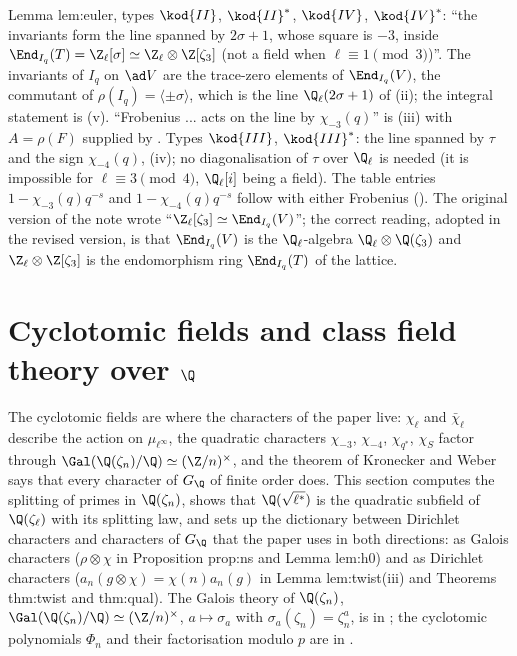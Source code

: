 \begin{paperlink}\label{pl:ant:euler}
Lemma lem:euler, types $\kod{II}$, $\kod{II}^*$, $\kod{IV}$, $\kod{IV}^*$: ``the invariants form the line spanned by $2\sigma+1$, whose square is $-3$, inside
$\End_{I_q}(T)=\Z_\ell[\sigma]\simeq\Z_\ell\otimes\Z[\zeta_3]$ (not a field when $\ell\equiv1\pmod3$)''. The invariants of $I_q$ on $\ad V$ are the trace-zero
elements of $\End_{I_q}(V)$, the commutant of $\rho(I_q)=\langle\pm\sigma\rangle$, which is the line $\Q_\ell(2\sigma+1)$ of (ii); the
integral statement is (v). ``Frobenius ... acts on the line by $\chi_{-3}(q)$'' is (iii) with $A=\rho(F)$
supplied by . Types $\kod{III}$, $\kod{III}^*$: the line spanned by $\tau$ and the sign $\chi_{-4}(q)$, (iv); no
diagonalisation of $\tau$ over $\Q_\ell$ is needed (it is impossible for $\ell\equiv3\pmod4$, $\Q_\ell[i]$ being a field). The table entries
$1-\chi_{-3}(q)q^{-s}$ and $1-\chi_{-4}(q)q^{-s}$ follow with either Frobenius (). The original version of the note wrote ``$\Z_\ell[\zeta_3]\simeq
\End_{I_q}(V)$''; the correct reading, adopted in the revised version, is that $\End_{I_q}(V)$ is the $\Q_\ell$-algebra $\Q_\ell\otimes\Q(\zeta_3)$ and
$\Z_\ell\otimes\Z[\zeta_3]$ is the endomorphism ring $\End_{I_q}(T)$ of the lattice.
\end{paperlink}

\section{Cyclotomic fields and class field theory over \texorpdfstring{$\Q$}{Q}}\label{sec:ant:cyclotomic}

The cyclotomic fields are where the characters of the paper live: $\chi_\ell$ and $\bar\chi_\ell$ describe the action on $\mu_{\ell^\infty}$, the quadratic
characters $\chi_{-3}$, $\chi_{-4}$, $\chi_{q^*}$, $\chi_S$ factor through $\Gal(\Q(\zeta_n)/\Q)\simeq(\Z/n)^\times$, and the theorem of Kronecker and Weber
says that every character of $G_\Q$ of finite order does. This section computes the splitting of primes in $\Q(\zeta_n)$, shows that
$\Q(\sqrt{\ell^*})$ is the quadratic subfield of $\Q(\zeta_\ell)$ with its splitting law, and sets up the dictionary between Dirichlet characters and
characters of $G_\Q$ that the paper uses in both directions: as Galois characters ($\rho\otimes\chi$ in Proposition prop:ns and Lemma lem:h0) and as
Dirichlet characters ($a_n(g\otimes\chi)=\chi(n)a_n(g)$ in Lemma lem:twist(iii) and Theorems thm:twist and thm:qual). The Galois theory of $\Q(\zeta_n)$,
$\Gal(\Q(\zeta_n)/\Q)\simeq(\Z/n)^\times$, $a\mapsto\sigma_a$ with $\sigma_a(\zeta_n)=\zeta_n^a$, is in ; the cyclotomic polynomials $\Phi_n$ and
their factorisation modulo $p$ are in .

